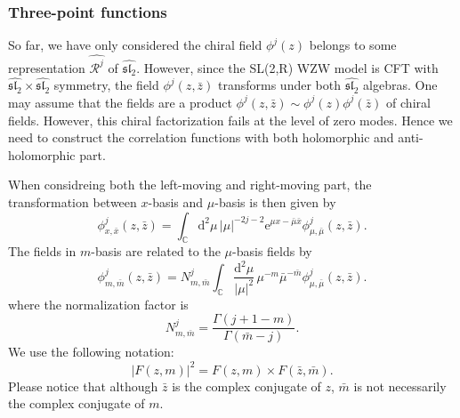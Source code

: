 \documentclass[10pt,a4paper]{article}
\numberwithin{equation}{section}
\begin{document}
\subsubsection*{Three-point functions}
So far, we have only considered the chiral field $\phi^{j}(z)$ belongs to some representation $\widehat{\mathcal{R}^{j}}$ of 
$\widehat{\mathfrak{sl}_{2}}$. However, since the SL(2,R) WZW model is CFT with $\widehat{\mathfrak{sl}_{2}}\times\widehat{\mathfrak{sl}_{2}}$ 
symmetry, the field $\phi^{j}(z,\bar{z})$ transforms under both $\widehat{\mathfrak{sl}_{2}}$ algebras. One may assume that 
the fields are a product $\phi^{j}(z,\bar{z}) \sim \phi^{j}(z)\phi^{j}(\bar{z})$ of chiral fields. However, this chiral 
factorization fails at the level of zero modes. Hence we need to construct the correlation functions with both holomorphic and anti-holomorphic 
part.

When considreing both the left-moving and right-moving part, the transformation between $x$-basis and $\mu$-basis is then given by 
\begin{equation}
    \phi^{j}_{x,\bar{x}}(z,\bar{z}) = \int_{\mathbb{C}} \mathrm{d}^{2} \mu \, |\mu|^{-2j-2} \mathrm{e}^{\mu x - \bar{\mu} \bar{x}} \phi^{j}_{\mu,\bar{\mu}}(z,\bar{z}).
\end{equation}
The fields in $m$-basis are related to the $\mu$-basis fields by 
\begin{equation}
    \phi^{j}_{m,\bar{m}}(z,\bar{z}) = N^{j}_{m,\bar{m}} \int_{\mathbb{C}} \frac{\mathrm{d}^{2} \mu }{|\mu|^{2}} \, \mu^{-m} \bar{\mu}^{-\bar{m}} \phi^{j}_{\mu,\bar{\mu}} (z,\bar{z}).
\end{equation}
where the normalization factor is 
\begin{equation}
    N^{j}_{m,\bar{m}} = \frac{\Gamma(j+1-m)}{\Gamma(\bar{m} - j)}.
\end{equation} 
We use the following notation:
\begin{equation}
    \left| F(z,m) \right|^{2} = F(z,m) \times F(\bar{z},\bar{m}).
\end{equation}
Please notice that although $\bar{z}$ is the complex conjugate of $z$, $\bar{m}$ is not necessarily the complex conjugate of $m$. 
\end{document}
